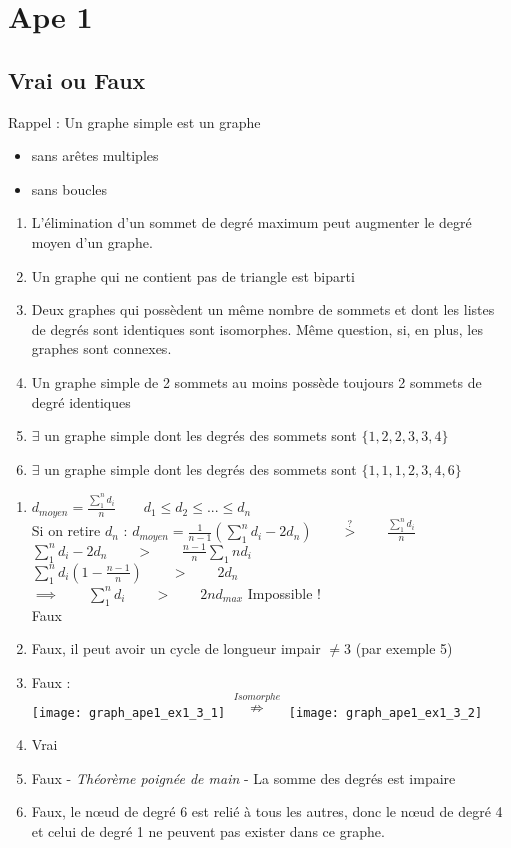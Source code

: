 \section{Ape 1}

\subsection{Vrai ou Faux}
Rappel : Un graphe simple est un graphe
\begin{itemize}
\item sans arêtes multiples
\item sans boucles
 \end{itemize}
\begin{enumerate}
	\item{L'élimination d'un sommet de degré maximum peut augmenter le degré moyen d'un graphe.}
	\item{Un graphe qui ne contient pas de triangle est biparti}
	\item{Deux graphes qui possèdent un même nombre de sommets et dont les listes de degrés sont identiques sont isomorphes. Même question, si, en plus, les graphes sont connexes.}
	\item{Un graphe simple de 2 sommets au moins possède toujours 2 sommets de degré identiques}
	\item{$\exists$ un graphe simple dont les degrés des sommets sont $\{1,2,2,3,3,4\}$}
	\item{$\exists$ un graphe simple dont les degrés des sommets sont $\{1,1,1,2,3,4,6\}$}	
\end{enumerate}

\begin{solution}
\begin{enumerate}
\item{
$d_{moyen} = \frac{\sum_{1}^{n} d_{i}}{n} \qquad d_{1} \leq d_{2} \leq ... \leq d_{n}$\\
Si on retire $d_{n}$ :
$d_{moyen} = \frac{1}{n-1}  (\sum_{1}^{n} d_{i} -2d_{n}) \qquad \stackrel{?}{>} \qquad \frac{\sum_{1}^{n}  d_{i}}{n}$\\
$\sum_{1}^{n} d_{i} - 2d_{n} \qquad > \qquad \frac{n-1}{n} \sum_{1}{n} d_{i}$\\
$\sum_{1}^{n} d_{i}(1- \frac{n-1}{n}) \qquad > \qquad 2d_{n}$\\
$\implies \qquad \sum_{1}^{n} d_{i} \qquad > \qquad 2n d_{max}$ Impossible !\\
Faux
}
\item{Faux, il peut avoir un cycle de longueur impair $\neq3$ (par exemple 5)}
\item{Faux :\\  
\texttt{[image: graph\_ape1\_ex1\_3\_1]}
$ \stackrel{Isomorphe}{\nRightarrow}$
\texttt{[image: graph\_ape1\_ex1\_3\_2]}
}
\item{Vrai}
\item{Faux - \textit{Théorème poignée de main} - La somme des degrés est impaire}
\item{Faux, le nœud de degré 6 est relié à tous les autres, donc le nœud de degré 4 et celui de degré 1 ne peuvent pas exister dans ce graphe.}
\end{enumerate}
\end{solution}

